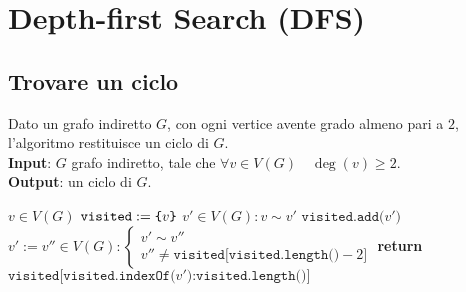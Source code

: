 \documentclass[a4paper, 12pt]{report}
\begin{document}
    \section{Depth-first Search (DFS)}

    \subsection{Trovare un ciclo}

    \begin{algorithm}[H]
        \caption{
            Dato un grafo indiretto $G$, con ogni vertice avente grado almeno pari a $2$, l'algoritmo restituisce un ciclo di $G$.\\
            \textbf{Input}: $G$ grafo indiretto, tale che $\forall v \in V(G) \quad \deg(v) \ge 2$.\\
            \textbf{Output}: un ciclo di $G$.
        }

        \begin{algorithmic}[1]
                \State $v \in V(G)$ 
                \State $\texttt{visited} := \verb|{|v\verb|}|$ 
                \State $v' \in V(G) : v \sim v'$
                 
                    \State $\texttt{visited.add(}v'\texttt{)}$
                    \State $v' := v'' \in V(G) : \left \{ \begin{array}{l}v' \sim v'' \\ v'' \neq \texttt{visited[visited.length()} - 2\texttt{]} \end{array} \right.$
                \EndWhile
                \State \textbf{return} $\texttt{visited[visited.indexOf(}v'\texttt{)} \texttt{:} \texttt{visited.length()]}$
            \EndFunction
        \end{algorithmic}
    \end{algorithm}
\end{document}
